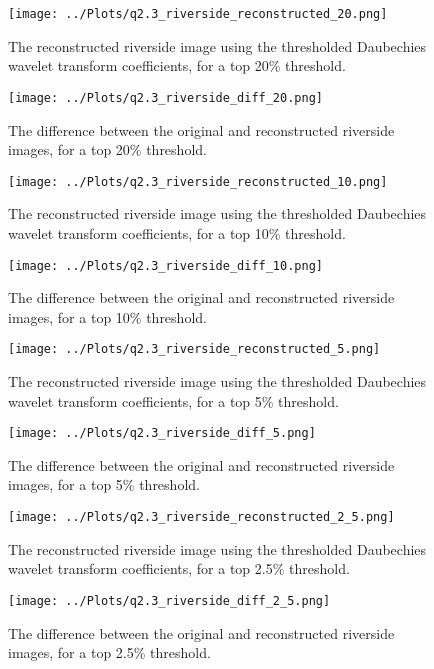\documentclass[12pt]{report} %
\begin{document}
\begin{figure}[htbp]
    \centering
    \texttt{[image: ../Plots/q2.3\_riverside\_reconstructed\_20.png]}
    \caption{The reconstructed riverside image using the thresholded Daubechies wavelet transform coefficients, for a top 20\% threshold.}
    \label{fig:reconstructed_image20}
\end{figure}

\begin{figure}[htbp]
    \centering
    \texttt{[image: ../Plots/q2.3\_riverside\_diff\_20.png]}
    \caption{The difference between the original and reconstructed riverside images, for a top 20\% threshold.}
    \label{fig:diff_image20}
\end{figure}

\begin{figure}[htbp]
    \centering
    \texttt{[image: ../Plots/q2.3\_riverside\_reconstructed\_10.png]}
    \caption{The reconstructed riverside image using the thresholded Daubechies wavelet transform coefficients, for a top 10\% threshold.}
    \label{fig:reconstructed_image10}
\end{figure}

\begin{figure}[htbp]
    \centering
    \texttt{[image: ../Plots/q2.3\_riverside\_diff\_10.png]}
    \caption{The difference between the original and reconstructed riverside images, for a top 10\% threshold.}
    \label{fig:diff_image10}
\end{figure}


\begin{figure}[htbp]
    \centering
    \texttt{[image: ../Plots/q2.3\_riverside\_reconstructed\_5.png]}
    \caption{The reconstructed riverside image using the thresholded Daubechies wavelet transform coefficients, for a top 5\% threshold.}
    \label{fig:reconstructed_image5}
\end{figure}

\begin{figure}[htbp]
    \centering
    \texttt{[image: ../Plots/q2.3\_riverside\_diff\_5.png]}
    \caption{The difference between the original and reconstructed riverside images, for a top 5\% threshold.}
    \label{fig:diff_image5}
\end{figure}

\begin{figure}[htbp]
    \centering
    \texttt{[image: ../Plots/q2.3\_riverside\_reconstructed\_2\_5.png]}
    \caption{The reconstructed riverside image using the thresholded Daubechies wavelet transform coefficients, for a top 2.5\% threshold.}
    \label{fig:reconstructed_image2.5}
\end{figure}

\begin{figure}[htbp]
    \centering
    \texttt{[image: ../Plots/q2.3\_riverside\_diff\_2\_5.png]}
    \caption{The difference between the original and reconstructed riverside images, for a top 2.5\% threshold.}
    \label{fig:diff_image2.5}
\end{figure}





\end{document}
